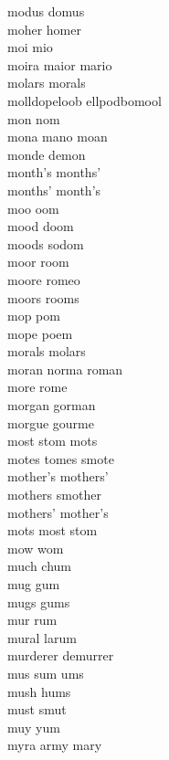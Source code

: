 modus domus\\
moher homer\\
moi mio\\
moira maior mario\\
molars morals\\
molldopeloob ellpodbomool\\
mon nom\\
mona mano moan\\
monde demon\\
month's months'\\
months' month's\\
moo oom\\
mood doom\\
moods sodom\\
moor room\\
moore romeo\\
moors rooms\\
mop pom\\
mope poem\\
morals molars\\
moran norma roman\\
more rome\\
morgan gorman\\
morgue gourme\\
most stom mots\\
motes tomes smote\\
mother's mothers'\\
mothers smother\\
mothers' mother's\\
mots most stom\\
mow wom\\
much chum\\
mug gum\\
mugs gums\\
mur rum\\
mural larum\\
murderer demurrer\\
mus sum ums\\
mush hums\\
must smut\\
muy yum\\
myra army mary\\

